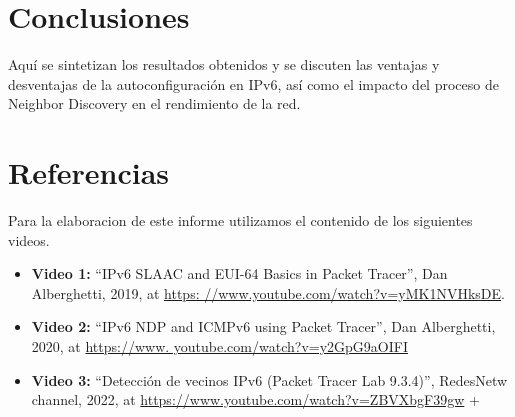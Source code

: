 \documentclass[a4paper,12pt]{article}
\begin{document}
\section{Conclusiones}
Aquí se sintetizan los resultados obtenidos y se discuten las ventajas y desventajas de la autoconfiguración en IPv6, así como el impacto del proceso de Neighbor Discovery en el rendimiento de la red.

\section{Referencias}
Para la elaboracion de este informe utilizamos el contenido de los siguientes videos. 
\begin{itemize}
  \item \textbf{Video 1:} “IPv6 SLAAC and EUI-64 Basics in Packet Tracer”, Dan Alberghetti, 2019, at \url{https:
  //www.youtube.com/watch?v=yMK1NVHksDE}.
  \item \textbf{Video 2:} “IPv6 NDP and ICMPv6 using Packet Tracer”, Dan Alberghetti, 2020, at \url{https://www.
  youtube.com/watch?v=y2GpG9aOIFI}
  \item \textbf{Video 3:} “Detección de vecinos IPv6 (Packet Tracer Lab 9.3.4)”, RedesNetw channel, 2022, at \url{https://www.youtube.com/watch?v=ZBVXbgF39gw}
+\end{itemize}
\end{document}
